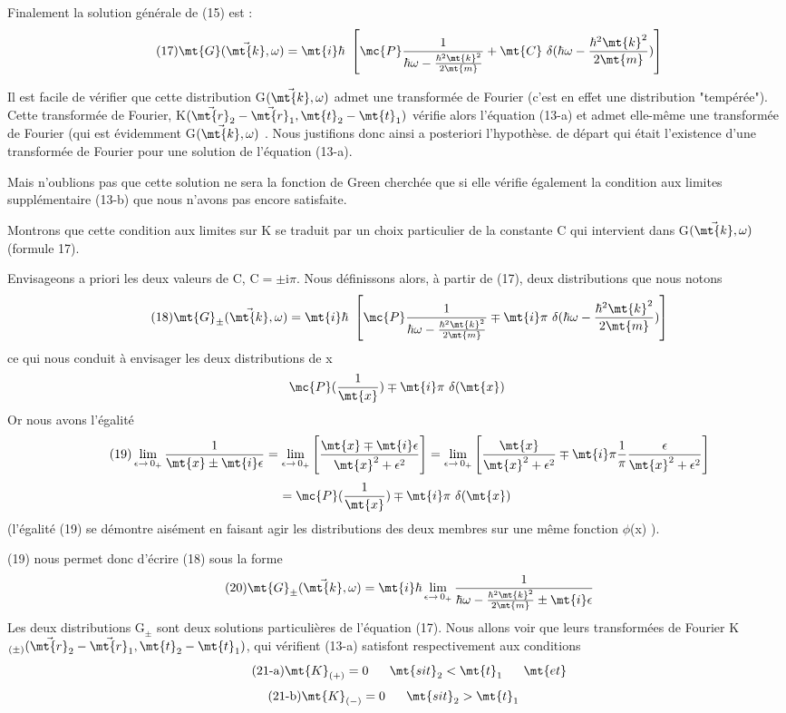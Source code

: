 Finalement la solution générale de (15) est :
\[
\tag{17}\mt{G}(\vec{\mt{k}},\omega)=\mt{i}\hbar\ \left[\mc{P}\frac{1}{\hbar\omega-\frac{\hbar^2\mt{k}^2}{2\mt{m}}}+\mt{C}\ \delta(\hbar\omega-\frac{\hbar^2\mt{k}^2}{2\mt{m}})\right]
\]

Il est facile de vérifier que cette distribution G$(\vec{\mt{k}},\omega)$ admet une
transformée de Fourier (c'est en effet une distribution "tempérée").
Cette transformée de Fourier, K$(\vec{\mt{r}}_2-\vec{\mt{r}}_1,\mt{t}_2-\mt{t}_1)$ vérifie alors l'équation
(13-a) et admet elle-même une transformée de Fourier (qui est évidemment
G$(\vec{\mt{k}},\omega)$ . Nous justifions donc ainsi a posteriori l'hypothèse. de départ
qui était l'existence d'une transformée de Fourier pour une solution de
l'équation (13-a).

Mais n'oublions pas que cette solution ne sera la fonction de
Green cherchée que si elle vérifie également la condition aux limites supplémentaire (13-b) que nous n'avons pas encore satisfaite.

Montrons que cette condition aux limites sur K se traduit par
un choix particulier de la constante C qui intervient dans G$(\vec{\mt{k}},\omega)$
(formule 17).

Envisageons a priori les deux valeurs de C, C$=\pm$i$\pi$.
Nous définissons alors, à partir de (17), deux distributions que nous notons
\[
\tag{18}\mt{G}_\pm(\vec{\mt{k}},\omega)=\mt{i}\hbar\ \left[\mc{P}\frac{1}{\hbar\omega-\frac{\hbar^2\mt{k}^2}{2\mt{m}}}
\mp\mt{i}\pi\ \delta(\hbar\omega-\frac{\hbar^2\mt{k}^2}{2\mt{m}})\right]
\]
ce qui nous conduit à envisager les deux distributions de x
\[
\mc{P}(\frac{1}{\mt{x}})\mp\mt{i}\pi\ \delta(\mt{x})
\]
Or nous avons l'égalité
\[
\tag{19}\lim_{\epsilon\to\,0_+}\frac{1}{\mt{x}\pm\mt{i}\epsilon}
=\lim_{\epsilon\to\,0_+}\left[\frac{\mt{x}\mp\mt{i}\epsilon}{\mt{x}^2+\epsilon^2}\right]
=\lim_{\epsilon\to\,0_+}\left[\frac{\mt{x}}{\mt{x}^2+\epsilon^2}\mp\mt{i}\pi\frac{1}{\pi}\frac{\epsilon}{\mt{x}^2+\epsilon^2}\right]
\]
\[
=\mc{P}(\frac{1}{\mt{x}})\mp\mt{i}\pi\ \delta(\mt{x})
\]
(l'égalité (19) se démontre aisément en faisant agir les distributions des
deux membres sur une même fonction $\phi$(x) ).

(19) nous permet donc d'écrire (18) sous la forme
\[
\tag{20}\mt{G}_\pm(\vec{\mt{k}},\omega)=\mt{i}\hbar\lim_{\epsilon\to\,0_+}
\frac{1}{\hbar\omega-\frac{\hbar^2\mt{k}^2}{2\mt{m}}\pm\mt{i}\epsilon}
\]
Les deux distributions G$_\pm$ sont deux solutions particulières de l'équation
(17). Nous allons voir que leurs transformées de Fourier K$_{(\pm)}(\vec{\mt{r}}_2-\vec{\mt{r}}_1,\mt{t}_2-\mt{t}_1)$,
qui vérifient (13-a) satisfont respectivement aux conditions
\[
\tag{21-a}\mt{K}_{(+)}=0\ \ \ \ \ \mt{si t}_2<\mt{t}_1\ \ \ \ \ \mt{et}
\]
\[
\tag{21-b}\mt{K}_{(-)}=0\ \ \ \ \ \mt{si t}_2>\mt{t}_1\ \ \ \ \ \ \ \,
\]

